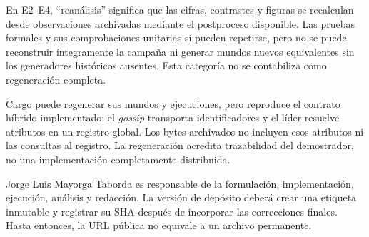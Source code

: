 En E2--E4, ``reanálisis'' significa que las cifras, contrastes y figuras se
recalculan desde observaciones archivadas mediante el postproceso disponible. Las
pruebas formales y sus comprobaciones unitarias sí pueden repetirse, pero no se
puede reconstruir íntegramente la campaña ni generar mundos nuevos equivalentes
sin los generadores históricos ausentes. Esta categoría no se contabiliza como
regeneración completa.

Cargo puede regenerar sus mundos y ejecuciones, pero reproduce el contrato
híbrido implementado: el \emph{gossip} transporta identificadores y el líder
resuelve atributos en un registro global. Los bytes archivados no incluyen esos
atributos ni las consultas al registro. La regeneración acredita trazabilidad del
demostrador, no una implementación completamente distribuida.

Jorge Luis Mayorga Taborda es responsable de la formulación, implementación,
ejecución, análisis y redacción. La versión de depósito deberá crear una etiqueta
inmutable y registrar su SHA después de incorporar las correcciones finales. Hasta
entonces, la URL pública no equivale a un archivo permanente.
